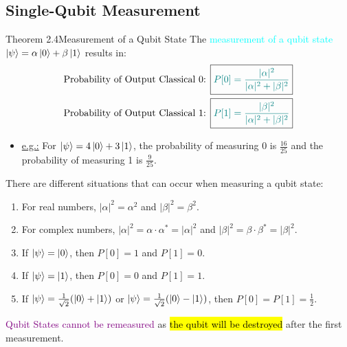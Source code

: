 \documentclass{book}
\begin{document}
\subsection{Single-Qubit Measurement}
\begin{thmBox}{Theorem 2.4}{Measurement of a Qubit State}
    The \textcolor{cyan}{measurement of a qubit state} \textcolor{brown}{\(\ket{\psi} = \alpha \ket{0} + \beta \ket{1}\)} results in:
    \begin{align*}
        & \text{Probability of Output Classical 0: } \boxed{\textcolor{teal}{P[0] = \frac{|\alpha|^2}{|\alpha|^2 + |\beta|^2}}} \\
        & \text{Probability of Output Classical 1: } \boxed{\textcolor{teal}{P[1] = \frac{|\beta|^2}{|\alpha|^2 + |\beta|^2}}} 
    \end{align*}
\end{thmBox}
\begin{itemize}
    \item \uline{e.g.:} For  \(\ket{\psi} = 4\ket{0} + 3\ket{1}\), the probability of measuring 0 is \(\frac{16}{25}\) and the probability of measuring 1 is \(\frac{9}{25}\).
\end{itemize}
There are different situations that can occur when measuring a qubit state:
\begin{enumerate}
    \item For real numbers, \(|\alpha|^2 = \alpha^2\) and \(|\beta|^2 = \beta^2\).
    \item For complex numbers, \(|\alpha|^2 = \alpha \cdot \alpha^* = |\alpha|^2\) and \(|\beta|^2 = \beta \cdot \beta^* = |\beta|^2\).
    \item If \(\ket{\psi} = \ket{0}\), then \(P[0] = 1\) and \(P[1] = 0\).
    \item If \(\ket{\psi} = \ket{1}\), then \(P[0] = 0\) and \(P[1] = 1\).
    \item If \(\ket{\psi} = \frac{1}{\sqrt{2}}(\ket{0} + \ket{1})\) or \(\ket{\psi} = \frac{1}{\sqrt{2}}(\ket{0} - \ket{1})\), then \(P[0] = P[1] = \frac{1}{2}\).
\end{enumerate}
\textcolor{purple}{Qubit States cannot be remeasured} as \hl{the qubit will be destroyed} after the first measurement.\\
\end{document}
